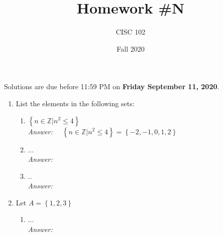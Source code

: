 \documentclass[12pt]{article}
\title{Homework \#N}
\author{CISC 102}
\date{Fall 2020}
\newcommand{\answer}{\vspace{.25cm}\emph{Answer:~~}}
\newcommand{\set}[1]{\left\{ #1 \right\}}
\newcommand{\zz}{\ensuremath{\mathbb{Z}}}
\begin{document}
\maketitle

\par\noindent Solutions are due before 11:59 PM on \textbf{Friday  September 11, 2020}. 


\begin{enumerate}


\item List the elements in the following sets:
\begin{enumerate}
	\item $\set{n\in\zz\vert n^2 \leq 4}$ \\
	\answer
	{\color{red} $\set{n\in\zz\vert n^2 \leq 4} = \set{-2,-1,0,1,2}$} 
	\item ...\\
	\answer 
	\item ..\\
	\answer

	
\end{enumerate}

\item  Let $A = \set{1,2,3}$
\begin{enumerate} 
	\item  ... \\
	\answer  

\end{enumerate}



\end{enumerate}
\end{document}
